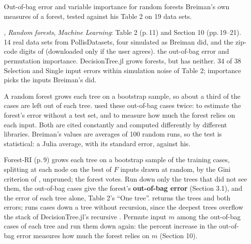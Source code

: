 



  {Out-of-bag error and variable importance for random forests}
  {Breiman's own measures of a forest, tested against his Table 2 on 19 data sets.}

\factsheet
  {, \emph{Random forests}, \emph{Machine Learning}: Table 2 (p.\,11) and Section 10 (pp.\,19--21).
   14 real data sets from PollisDatasets, four simulated as Breiman did, and the zip-code digits of 
   (downloaded only if the user agrees).}
  {the out-of-bag error and permutation importance. DecisionTree.jl grows forests, but has neither.}
  {}
  {34 of 38 Selection and Single input errors within simulation noise of Table 2; importance picks the inputs Breiman's did.}

A random forest grows each tree on a bootstrap sample, so about a third of the cases are left out of each tree.  used
these out-of-bag cases twice: to estimate the forest's error without a test set, and to measure how much the forest relies on
each input. Both are cited constantly and computed differently by different libraries. Breiman's values are averages of 100
random runs, so the test is statistical: a Julia average, with its standard error, against his.

Forest-RI (p.\,9) grows each tree on a bootstrap sample of the training cases, splitting at each node on the best of $F$
inputs drawn at random, by the Gini criterion of , unpruned; the forest votes. Run down only the trees that did not see them, the
out-of-bag cases give the forest's \textbf{out-of-bag error} (Section 3.1), and the error of each tree alone, Table 2's
``One tree''.  returns the trees and both errors;  runs cases down a tree without recursion, since the
deepest trees overflow the stack of DecisionTree.jl's recursive .
Permute input $m$ among the out-of-bag cases of each tree and run them down again: the percent increase in the out-of-bag
error measures how much the forest relies on $m$ (Section 10).

